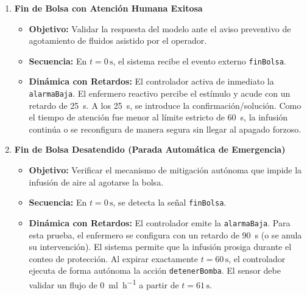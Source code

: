\documentclass[11pt,a4paper]{article}
\begin{document}
\begin{enumerate}[label=\textbf{Escenario \arabic*:}, startingvalue=7, leftmargin=*]
    \item \textbf{Fin de Bolsa con Atención Humana Exitosa}
    \begin{itemize}
        \item \textbf{Objetivo:} Validar la respuesta del modelo ante el aviso preventivo de agotamiento de fluidos asistido por el operador.
        \item \textbf{Secuencia:} En $t = 0\,\text{s}$, el sistema recibe el evento externo \texttt{finBolsa}.
        \item \textbf{Dinámica con Retardos:} El controlador activa de inmediato la \texttt{alarmaBaja}. El enfermero reactivo percibe el estímulo y acude con un retardo de \SI{25}{\second}. A los \SI{25}{\second}, se introduce la confirmación/solución. Como el tiempo de atención fue menor al límite estricto de \SI{60}{\second}, la infusión continúa o se reconfigura de manera segura sin llegar al apagado forzoso.
    \end{itemize}

    \item \textbf{Fin de Bolsa Desatendido (Parada Automática de Emergencia)}
    \begin{itemize}
        \item \textbf{Objetivo:} Verificar el mecanismo de mitigación autónoma que impide la infusión de aire al agotarse la bolsa.
        \item \textbf{Secuencia:} En $t = 0\,\text{s}$, se detecta la señal \texttt{finBolsa}.
        \item \textbf{Dinámica con Retardos:} El controlador emite la \texttt{alarmaBaja}. Para esta prueba, el enfermero se configura con un retardo de \SI{90}{\second} (o se anula su intervención). El sistema permite que la infusión prosiga durante el conteo de protección. Al expirar exactamente $t = 60\,\text{s}$, el controlador ejecuta de forma autónoma la acción \texttt{detenerBomba}. El sensor debe validar un flujo de \SI{0}{\ml\per\hour} a partir de $t = 61\,\text{s}$.
    \end{itemize}
\end{enumerate}
\end{document}
